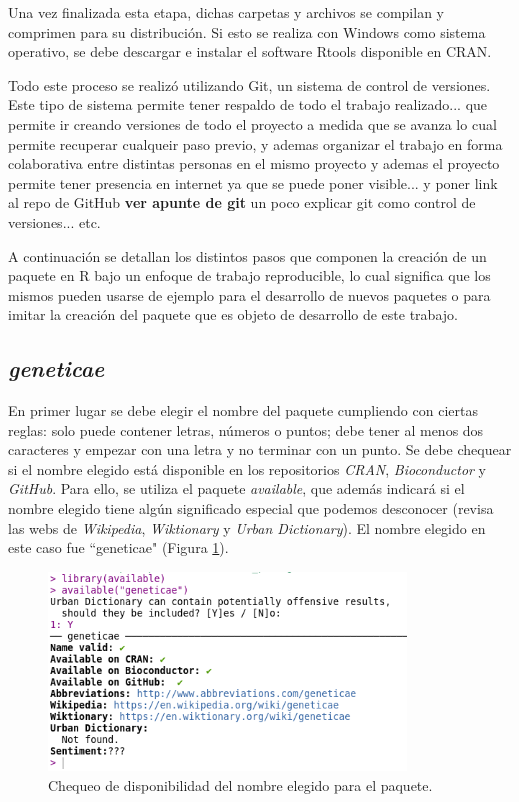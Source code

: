 Una vez finalizada esta etapa, dichas carpetas y archivos se compilan y comprimen para su distribución. Si esto se realiza con Windows como sistema operativo, se debe descargar e instalar el software Rtools disponible en CRAN. 

Todo este proceso se realizó utilizando Git, un sistema de control de versiones. Este tipo de sistema permite tener respaldo de todo el trabajo realizado...  que permite ir creando versiones de todo el proyecto a medida que se avanza lo cual permite recuperar cualqueir paso previo, y ademas organizar el trabajo en forma colaborativa entre distintas personas en el mismo proyecto y ademas el proyecto permite tener presencia en internet ya que se puede poner visible... y poner link al repo de GitHub \textbf{ver apunte de git} un poco explicar git como control de versiones... etc.

A continuación se detallan los distintos pasos que componen la creación de un paquete en R bajo un enfoque de trabajo reproducible, lo cual significa que los mismos pueden usarse de ejemplo para el desarrollo de nuevos paquetes o para imitar la creación del paquete que es objeto de desarrollo de este trabajo. 

\subsection{\emph{geneticae}}

En primer lugar se debe elegir el nombre del paquete cumpliendo con ciertas reglas: solo puede contener letras, números o puntos; debe tener al menos dos caracteres y empezar con una letra y no terminar con un punto. Se debe chequear si el nombre elegido está disponible en los repositorios  \emph{CRAN}, \emph{Bioconductor} y \emph{GitHub}. Para ello, se utiliza el paquete \emph{available}, que además indicará si el nombre elegido tiene algún significado especial que podemos desconocer (revisa las webs de \emph{Wikipedia}, \emph{Wiktionary} y \emph{Urban Dictionary}). El nombre elegido en este caso fue ``geneticae"  (Figura \ref{fig:fig31}). 

\begin{figure}[H]
\begin{center}
	\includegraphics[width=9.5cm]{./Graficos/available.png}	
\end{center}
	\caption{Chequeo de disponibilidad del nombre elegido para el paquete.}
\label{fig:fig31}
\end{figure}


